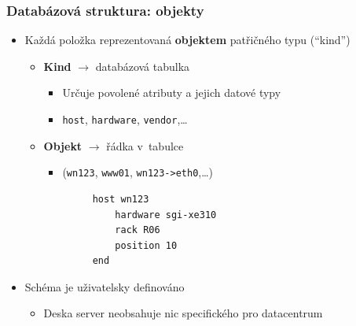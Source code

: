\documentclass{beamer}
\begin{document}
\begin{frame}[fragile]
\frametitle{Databázová struktura: objekty}
\begin{itemize}
    \item Každá položka reprezentovaná {\bf objektem} patřičného typu (``kind'')
        \begin{itemize}
            \item {\bf Kind} $\rightarrow$ databázová tabulka
                \begin{itemize}
                    \item Určuje povolené atributy a jejich datové typy
                    \item {\tt host}, {\tt hardware}, {\tt vendor},\ldots
                \end{itemize}
            \item {\bf Objekt} $\rightarrow$ řádka v~tabulce
                \begin{itemize}
                    \item ({\tt wn123}, {\tt www01}, {\tt wn123->eth0},\ldots)
                \end{itemize}
        \end{itemize}
        \begin{verbatim}
            host wn123
                hardware sgi-xe310
                rack R06
                position 10
            end
        \end{verbatim}
    \item Schéma je uživatelsky definováno
        \begin{itemize}
            \item Deska server neobsahuje nic specifického pro datacentrum
        \end{itemize}
\end{itemize}
\end{frame}
\end{document}
